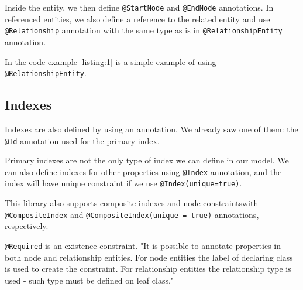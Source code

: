 Inside the entity, we then define \texttt{@StartNode} and \texttt{@EndNode} annotations.
In referenced entities, we also define a reference to the related entity and use \texttt{@Relationship} annotation with the same type as is in \texttt{@RelationshipEntity} annotation.

In the code example \ref{listing:1} is a simple example of using \texttt{@RelationshipEntity}.


\subsection {Indexes}

Indexes are also defined by using an annotation. We already saw one of them: the \texttt{@Id} annotation used for the primary index.

Primary indexes are not the only type of index we can define in our model.
We can also define indexes for other properties using \texttt{@Index} annotation, and the index will have unique constraint if we use \texttt{@Index(unique=true)}.

This library also supports composite indexes and node constraints\linebreak with \texttt{@CompositeIndex} and \texttt{@CompositeIndex(unique = true)} annotations, respectively.

\texttt{@Required} is an existence constraint. "It is possible to annotate properties in both node and relationship entities.
For node entities the label of declaring class is used to create the constraint.
For relationship entities the relationship type is used - such type must be defined on leaf class." \cite{noauthor_reference_nodate}

